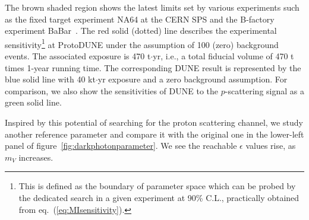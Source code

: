 The brown shaded region shows the latest limits set by various experiments such as the fixed target experiment NA64 at the CERN SPS and the B-factory experiment BaBar~\cite{Banerjee:2017hhz}.
The red solid (dotted) line describes the experimental sensitivity\footnote{This is defined as the boundary of parameter space which can be probed by the dedicated search in a given experiment at 90\% C.L., practically obtained from eq.~(\ref{eq:MIsensitivity}).} at ProtoDUNE under the assumption of 100 (zero) background events. 
The associated exposure is 470 t$\cdot$yr, i.e., a total fiducial volume of 470 t times 1-year running time. 
The corresponding DUNE result is represented by the blue solid line with 40 kt$\cdot$yr exposure and a zero background assumption. 
For comparison, we also show the sensitivities of DUNE to the $p$-scattering signal as a green solid line. 

Inspired by this potential of searching for the proton scattering channel, we study another reference parameter and compare it with the original one in the lower-left panel of figure~\ref{fig:darkphotonparameter}. 
We see the reachable $\epsilon$ values rise, as $m_V$ increases. 

